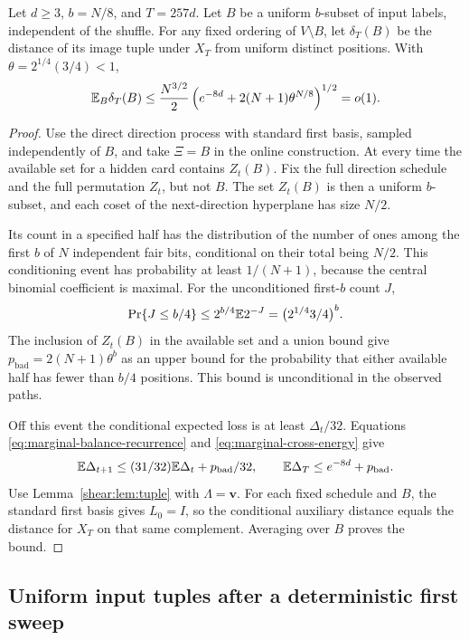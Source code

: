 \begin{proposition}
\label{shear:prop:reservoir}
Let $d\ge3$, $b=N/8$, and $T=257d$. Let $B$ be a uniform
$b$-subset of input labels, independent of the shuffle. For any
fixed ordering of $V\setminus B$, let $\delta_T(B)$ be the
distance of its image tuple under $X_T$ from uniform distinct
positions. With $\theta=2^{1/4}(3/4)<1$,
\begin{equation}\label{shear:eq:reservoir-marginal}
 \mathbb E_B\delta_T(B)
 \le\frac{N^{3/2}}2
 \left(e^{-8d}+2(N+1)\theta^{N/8}\right)^{1/2}=o(1).
\end{equation}
\end{proposition}
\begin{proof}
Use the direct direction process with standard first basis,
sampled independently of $B$, and take $\Xi=B$ in the online construction. At every time the
available set for a hidden card contains $Z_t(B)$. Fix the full
direction schedule and the full permutation $Z_t$, but not $B$.
The set $Z_t(B)$ is then a uniform $b$-subset, and each coset of
the next-direction hyperplane has size $N/2$.

Its count in a specified half has the distribution of the number
of ones among the first $b$ of $N$ independent fair bits,
conditional on their total being $N/2$. This conditioning event
has probability at least $1/(N+1)$, because the central binomial
coefficient is maximal. For the unconditioned first-$b$ count $J$,
\[
 \Pr\{J\le b/4\}
 \le2^{b/4}\mathbb E2^{-J}
 =\bigl(2^{1/4}3/4\bigr)^b.
\]
The inclusion of $Z_t(B)$ in the available set and a union
bound give
$p_{\mathrm{bad}}=2(N+1)\theta^b$ as an upper bound for the
probability that either available half has fewer than $b/4$
positions. This bound is unconditional in the observed paths.

Off this event the conditional expected loss is at least
$\Delta_t/32$. Equations \eqref{eq:marginal-balance-recurrence}
and \eqref{eq:marginal-cross-energy} give
\[
 \mathbb E\Delta_{t+1}\le(31/32)\mathbb E\Delta_t+p_{\mathrm{bad}}/32,
 \qquad
 \mathbb E\Delta_T\le e^{-8d}+p_{\mathrm{bad}}.
\]
Use Lemma~\ref{shear:lem:tuple} with $\Lambda=\mathbf v$.
For each fixed schedule and $B$, the standard first basis gives
$L_0=I$, so the conditional auxiliary distance equals the
distance for $X_T$ on that same complement. Averaging over $B$
proves the bound.
\end{proof}

\subsection{Uniform input tuples after a deterministic first sweep}

